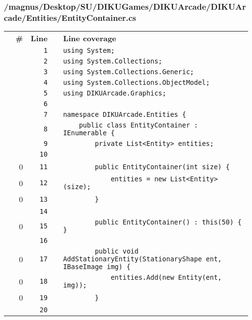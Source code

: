 \documentclass[a4paper,landscape,10pt]{article}
\begin{document}
\subsubsection{/magnus/Desktop/SU/DIKUGames/DIKUArcade/DIKUArcade/Entities/EntityContainer.cs}
\begin{longtable}[l]{lrrll}
\textbf{} & \textbf{\#} & \textbf{Line} & \textbf{} & \textbf{Line coverage}\\
\cellcolor{gray} &  & \verb~1~ & & \verb~using System;~\\
\cellcolor{gray} &  & \verb~2~ & & \verb~using System.Collections;~\\
\cellcolor{gray} &  & \verb~3~ & & \verb~using System.Collections.Generic;~\\
\cellcolor{gray} &  & \verb~4~ & & \verb~using System.Collections.ObjectModel;~\\
\cellcolor{gray} &  & \verb~5~ & & \verb~using DIKUArcade.Graphics;~\\
\cellcolor{gray} &  & \verb~6~ & & \verb~~\\
\cellcolor{gray} &  & \verb~7~ & & \verb~namespace DIKUArcade.Entities {~\\
\cellcolor{gray} &  & \verb~8~ & & \verb~    public class EntityContainer : IEnumerable {~\\
\cellcolor{gray} &  & \verb~9~ & & \verb~        private List<Entity> entities;~\\
\cellcolor{gray} &  & \verb~10~ & & \verb~~\\
\cellcolor{red} & 0 & \verb~11~ & & \verb~        public EntityContainer(int size) {~\\
\cellcolor{red} & 0 & \verb~12~ & & \verb~            entities = new List<Entity>(size);~\\
\cellcolor{red} & 0 & \verb~13~ & & \verb~        }~\\
\cellcolor{gray} &  & \verb~14~ & & \verb~~\\
\cellcolor{red} & 0 & \verb~15~ & & \verb~        public EntityContainer() : this(50) { }~\\
\cellcolor{gray} &  & \verb~16~ & & \verb~~\\
\cellcolor{red} & 0 & \verb~17~ & & \verb~        public void AddStationaryEntity(StationaryShape ent, IBaseImage img) {~\\
\cellcolor{red} & 0 & \verb~18~ & & \verb~            entities.Add(new Entity(ent, img));~\\
\cellcolor{red} & 0 & \verb~19~ & & \verb~        }~\\
\cellcolor{gray} &  & \verb~20~ & & \verb~~\\

\end{longtable}
\end{document}
